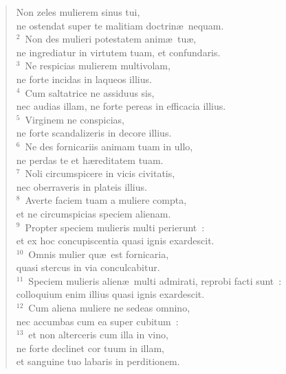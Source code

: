 \begin{flushleft}\begin{verse}\vspace{-19pt}Non zeles mulierem sinus tui,\\ ne ostendat super te malitiam doctrin\ae\ nequam.\\
${}^{2}$~Non des mulieri potestatem anim\ae\ tu\ae ,\\ ne ingrediatur in virtutem tuam, et confundaris.\\
${}^{3}$~Ne respicias mulierem multivolam,\\ ne forte incidas in laqueos illius.\\
${}^{4}$~Cum saltatrice ne assiduus sis,\\ nec audias illam, ne forte pereas in efficacia illius.\\
${}^{5}$~Virginem ne conspicias,\\ ne forte scandalizeris in decore illius.\\
${}^{6}$~Ne des fornicariis animam tuam in ullo,\\ ne perdas te et h\ae reditatem tuam.\\
${}^{7}$~Noli circumspicere in vicis civitatis,\\ nec oberraveris in plateis illius.\\
${}^{8}$~Averte faciem tuam a muliere compta,\\ et ne circumspicias speciem alienam.\\
${}^{9}$~Propter speciem mulieris multi perierunt~:\\ et ex hoc concupiscentia quasi ignis exardescit.\\
${}^{10}$~Omnis mulier qu\ae\ est fornicaria,\\ quasi stercus in via conculcabitur.\\
${}^{11}$~Speciem mulieris alien\ae\ multi admirati, reprobi facti sunt~:\\ colloquium enim illius quasi ignis exardescit.\\
${}^{12}$~Cum aliena muliere ne sedeas omnino,\\ nec accumbas cum ea super cubitum~:\\
${}^{13}$~et non alterceris cum illa in vino,\\ ne forte declinet cor tuum in illam,\\ et sanguine tuo labaris in perditionem.\end{verse}\end{flushleft}


